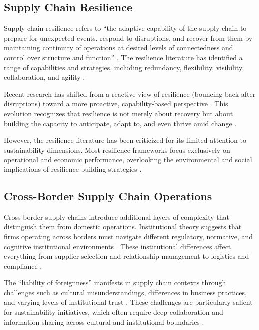\documentclass[12pt,a4paper,twoside]{article}
\begin{document}
\subsection{Supply Chain Resilience}

Supply chain resilience refers to ``the adaptive capability of the supply chain
to prepare for unexpected events, respond to disruptions, and recover from them
by maintaining continuity of operations at desired levels of connectedness and
control over structure and function'' \citep[p.~131]{ponomarov2009understanding}.
The resilience literature has identified a range of capabilities and strategies,
including redundancy, flexibility, visibility, collaboration, and agility
\citep{pettit2010ensuring, christopher2004building, scholten2015role}.

Recent research has shifted from a reactive view of resilience (bouncing back
after disruptions) toward a more proactive, capability-based perspective
\citep{wieland2021two, ali2017analyzing}.  This evolution recognizes that
resilience is not merely about recovery but about building the capacity to
anticipate, adapt to, and even thrive amid change
\citep{ivanov2019global, hosseini2019review}.

However, the resilience literature has been criticized for its limited attention
to sustainability dimensions.  Most resilience frameworks focus exclusively on
operational and economic performance, overlooking the environmental and social
implications of resilience-building strategies \citep{negri2021integrating,
fahimnia2015quantitative}.

\subsection{Cross-Border Supply Chain Operations}

Cross-border supply chains introduce additional layers of complexity that
distinguish them from domestic operations.  Institutional theory suggests that
firms operating across borders must navigate different regulatory, normative,
and cognitive institutional environments \citep{kostova1999transnational,
busse2017managing}.  These institutional differences affect everything from
supplier selection and relationship management to logistics and compliance
\citep{hofmann2018sustainability}.

The ``liability of foreignness'' \citep{zaheer1995overcoming} manifests in
supply chain contexts through challenges such as cultural misunderstandings,
differences in business practices, and varying levels of institutional trust
\citep{handfield2002applying, jia2018global}.  These challenges are particularly
salient for sustainability initiatives, which often require deep collaboration
and information sharing across cultural and institutional boundaries
\citep{busato2015sustainability, ehrgott2013environmental}.
\end{document}

